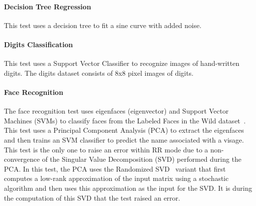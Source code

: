 \documentclass[11pt]{article}
\begin{document}

\paragraph{Decision Tree Regression}

This test uses a decision tree to fit a sine curve with added noise.




\paragraph{Digits Classification}

This test uses a Support Vector Classifier to recognize images of hand-written
digits. The digits dataset consists of 8x8 pixel images of digits.


\paragraph{Face Recognition}

The face recognition test uses eigenfaces (eigenvector) and Support Vector Machines (SVMs) to classify faces from the Labeled Faces in the Wild dataset~\cite{LFWTech}. This test uses a Principal Component Analysis (PCA) to extract the eigenfaces and then trains an SVM classifier to predict the name associated with a visage. This test is the only one to raise an error within RR mode due to a non-convergence of the Singular Value Decomposition (SVD) performed during the PCA.
In this test, the PCA uses the Randomized SVD~\cite{halko2011finding} variant that first computes a low-rank approximation of the input matrix using a stochastic algorithm and then uses this approximation as the input for the SVD. It is during the computation of this SVD that the test raised an error.
\end{document}
